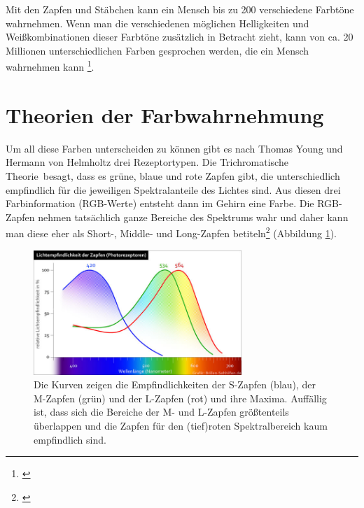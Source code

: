 
\noindent Mit den Zapfen und Stäbchen kann ein Mensch bis zu 200 verschiedene Farbtöne wahrnehmen. Wenn man die verschiedenen möglichen Helligkeiten und Weißkombinationen dieser Farbtöne zusätzlich in Betracht zieht, kann von ca. 20 Millionen unterschiedlichen Farben gesprochen werden, die ein Mensch wahrnehmen kann \footnote{\cite{unimann}}.



\section{Theorien der Farbwahrnehmung}
\label{sec_colour}
 
Um all diese Farben unterscheiden zu können gibt es nach Thomas Young und Hermann von Helmholtz drei Rezeptortypen. Die \glqq Trichromatische Theorie\grqq\ besagt, dass es grüne, blaue und rote Zapfen gibt, die unterschiedlich empfindlich für die jeweiligen Spektralanteile des Lichtes sind. Aus diesen drei Farbinformation (RGB-Werte) entsteht dann im Gehirn eine Farbe. Die RGB-Zapfen nehmen tatsächlich ganze Bereiche des Spektrums wahr und daher kann man diese eher als Short-, Middle- und Long-Zapfen betiteln\footnote{\cite[62-63]{greule}} (Abbildung \ref{b_sml}).

\begin{figure}[H]     %
\centering
\includegraphics[width=0.7\textwidth]{bilder/sml} 
\caption {Die Kurven zeigen die Empfindlichkeiten der S-Zapfen (blau), der M-Zapfen (grün) und der L-Zapfen (rot) und ihre Maxima. Auffällig ist, dass sich die Bereiche der M- und L-Zapfen größtenteils überlappen und die Zapfen für den (tief)roten Spektralbereich kaum empfindlich sind.\protect\footnotemark}\label{b_sml}
\end{figure}

